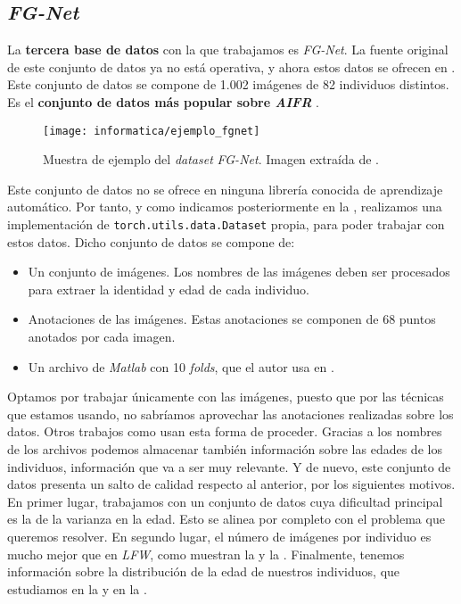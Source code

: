\subsection{\textit{FG-Net}} \label{isec:fgnet}

La \textbf{tercera base de datos} con la que trabajamos es \textit{FG-Net}. La fuente original de este conjunto de datos ya no está operativa, y ahora estos datos se ofrecen en \cite{informatica:fgnet_dataset}. Este conjunto de datos se compone de 1.002 imágenes de 82 individuos distintos. Es el \textbf{conjunto de datos más popular sobre \textit{AIFR}} \cite{informatica:best_fgnet_model}.

\begin{figure}[!hbtp]
    \centering
    \texttt{[image: informatica/ejemplo\_fgnet]}
    \caption{Muestra de ejemplo del \textit{dataset} \textit{FG-Net}. Imagen extraída de \cite{informatica:fg_net_papers_with_code}.}
\end{figure}

Este conjunto de datos no se ofrece en ninguna librería conocida de aprendizaje automático. Por tanto, y como indicamos posteriormente en la , realizamos una implementación de \lstinline{torch.utils.data.Dataset} propia, para poder trabajar con estos datos. Dicho conjunto de datos se compone de:

\begin{itemize}
    \item Un conjunto de imágenes. Los nombres de las imágenes deben ser procesados para extraer la identidad y edad de cada individuo.
    \item Anotaciones de las imágenes. Estas anotaciones se componen de 68 puntos anotados por cada imagen.
    \item Un archivo de \textit{Matlab} con 10 \textit{folds}, que el autor usa en \cite{informatica:yanweifu_work}.
\end{itemize}

Optamos por trabajar únicamente con las imágenes, puesto que por las técnicas que estamos usando, no sabríamos aprovechar las anotaciones realizadas sobre los datos. Otros trabajos como \cite{informatica:facenet} usan esta forma de proceder. Gracias a los nombres de los archivos podemos almacenar también información sobre las edades de los individuos, información que va a ser muy relevante. Y de nuevo, este conjunto de datos presenta un salto de calidad respecto al anterior, por los siguientes motivos. En primer lugar, trabajamos con un conjunto de datos cuya dificultad principal es la de la varianza en la edad. Esto se alinea por completo con el problema que queremos resolver. En segundo lugar, el número de imágenes por individuo es mucho mejor que en \textit{LFW}, como muestran la  y la . Finalmente, tenemos información sobre la distribución de la edad de nuestros individuos, que estudiamos en la  y en la .

